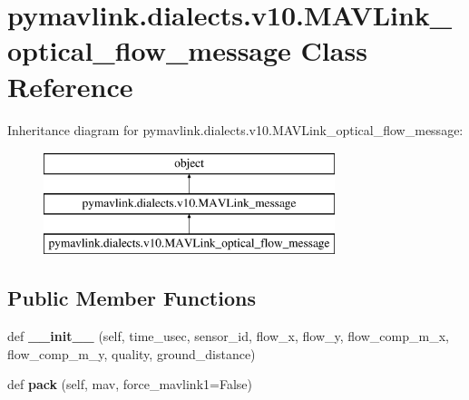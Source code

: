 \hypertarget{classpymavlink_1_1dialects_1_1v10_1_1MAVLink__optical__flow__message}{}\section{pymavlink.\+dialects.\+v10.\+M\+A\+V\+Link\+\_\+optical\+\_\+flow\+\_\+message Class Reference}
\label{classpymavlink_1_1dialects_1_1v10_1_1MAVLink__optical__flow__message}
Inheritance diagram for pymavlink.\+dialects.\+v10.\+M\+A\+V\+Link\+\_\+optical\+\_\+flow\+\_\+message\+:\begin{figure}[H]
\begin{center}
\leavevmode
\includegraphics[height=3.000000cm]{classpymavlink_1_1dialects_1_1v10_1_1MAVLink__optical__flow__message}
\end{center}
\end{figure}
\subsection*{Public Member Functions}
\begin{DoxyCompactItemize}
\item 
\mbox{\label{classpymavlink_1_1dialects_1_1v10_1_1MAVLink__optical__flow__message_a94d08bba016a033ce02ba56ef149031b}} 
def {\bfseries \+\_\+\+\_\+init\+\_\+\+\_\+} (self, time\+\_\+usec, sensor\+\_\+id, flow\+\_\+x, flow\+\_\+y, flow\+\_\+comp\+\_\+m\+\_\+x, flow\+\_\+comp\+\_\+m\+\_\+y, quality, ground\+\_\+distance)
\item 
\mbox{\label{classpymavlink_1_1dialects_1_1v10_1_1MAVLink__optical__flow__message_a5ade520a4f8fdae15cdb5a01170ecd80}} 
def {\bfseries pack} (self, mav, force\+\_\+mavlink1=False)
\end{DoxyCompactItemize}
